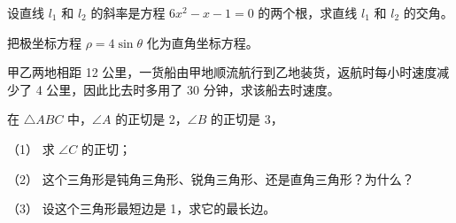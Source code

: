 \begin{question}
设直线 $l_{1}$ 和 $l_{2}$ 的斜率是方程 $6x^{2}-x-1=0$ 的两个根，求直线 $l_{1}$ 和 $l_{2}$ 的交角。

\end{question}
\begin{question}
把极坐标方程 $\rho=4\sin\theta$ 化为直角坐标方程。

\end{question}
\begin{question}
甲乙两地相距 12 公里，一货船由甲地顺流航行到乙地装货，返航时每小时速度减少了 4 公里，因此比去时多用了 30 分钟，求该船去时速度。

\end{question}
\begin{question}
在 $\triangle ABC$ 中，$\angle A$ 的正切是 2，$\angle B$ 的正切是 3，

（1） 求 $\angle C$ 的正切；

（2） 这个三角形是钝角三角形、锐角三角形、还是直角三角形？为什么？

（3） 设这个三角形最短边是 1，求它的最长边。

\end{question}